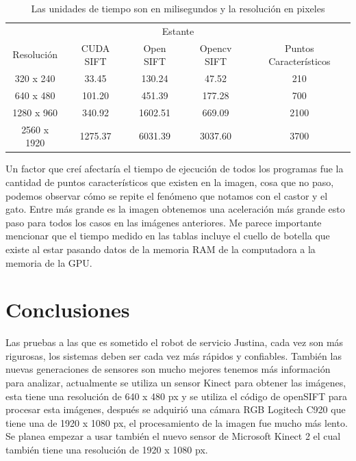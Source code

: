 \begin{table}[phtb]
\centering
\begin{tabular}{|c|c|c|c|c|}
\hline

\multicolumn{5}{|c|}{Estante} \\
\cline{1-5}
Resolución & CUDA SIFT & Open SIFT & Opencv SIFT & Puntos Característicos\\
\hline \hline
 320 x 240  & 33.45   & 130.24   & 47.52   & 210\\ \cline{1-5}
 640 x 480  & 101.20  &  451.39  & 177.28  & 700\\ \cline{1-5}
1280 x 960  & 340.92  &  1602.51 & 669.09  & 2100\\ \cline{1-5}
2560 x 1920 & 1275.37 &  6031.39 & 3037.60 & 3700\\ \cline{1-5}

\end{tabular}
\caption{Las unidades de tiempo son en milisegundos y la resolución en pixeles}
\label{tabla:final}
\end{table}

Un factor que creí afectaría el tiempo de ejecución de todos los programas fue la cantidad de puntos característicos que existen en la imagen, cosa que no paso, podemos observar cómo se repite el fenómeno que notamos con el castor y el gato. Entre más grande es la imagen obtenemos una aceleración más grande esto paso para todos los casos en las imágenes anteriores. Me parece importante mencionar que el tiempo medido en las tablas incluye el cuello de botella que existe al estar pasando datos de la memoria RAM de la computadora a la memoria de la GPU.     

\pagebreak
\section{Conclusiones}

 Las pruebas a las que es sometido el robot de servicio Justina, cada vez son más rigurosas, los sistemas deben ser cada vez más rápidos y confiables. También las nuevas generaciones de sensores son mucho mejores tenemos más información para analizar, actualmente se utiliza un sensor Kinect para obtener las imágenes, esta tiene una resolución de  640 x 480 px y se utiliza el código de openSIFT para procesar esta imágenes, después     se adquirió una cámara RGB Logitech C920 que tiene una  de 1920 x 1080 px, el procesamiento de la imagen fue mucho más lento. Se planea empezar a usar también el nuevo sensor de Microsoft Kinect 2 el cual también tiene una resolución de 1920 x 1080 px. 
 
